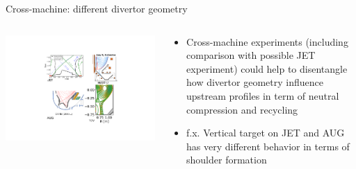 \documentclass[10pt, compress]{beamer}
\begin{document}
\begin{frame}{Cross-machine: different divertor geometry}
  \begin{columns}
    \begin{column}{0.5\textwidth}
  \includegraphics[width=\textwidth]{../generalFigures/Divertors}
\end{column}
\begin{column}{0.5\textwidth}
  \begin{itemize}
    \item Cross-machine experiments (including comparison with
      possible JET experiment) could help to disentangle how divertor
      geometry influence upstream profiles in term of neutral
      compression and recycling
    \item \alert{f.x. Vertical target on JET and AUG has very
        different behavior in terms of shoulder formation}
    \end{itemize}
  \end{column}
\end{columns}
\end{frame}
\end{document}
